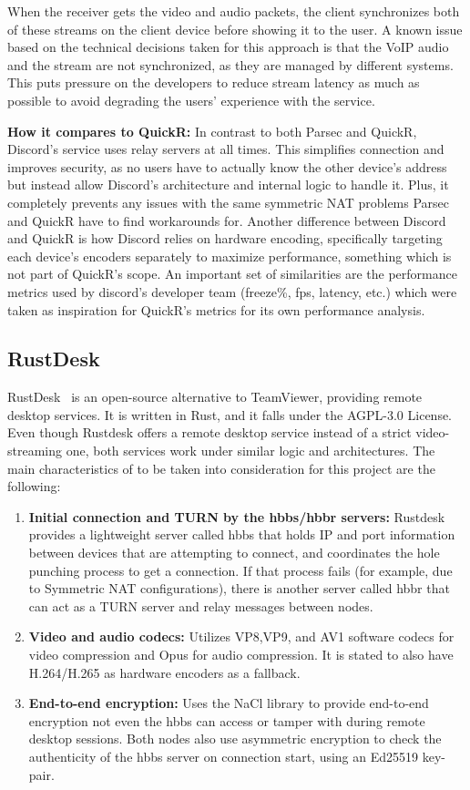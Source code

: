 \documentclass{article}
\begin{document}
    When the receiver gets the video and audio packets, the client synchronizes both of these streams on the client device before showing it to the user. A known issue based on the technical decisions taken for this approach is that the VoIP audio and the stream are not synchronized, as they are managed by 
    different systems. This puts pressure on the developers to reduce stream latency as much as possible to avoid degrading the users' experience with the service.

    \textbf{How it compares to QuickR:} In contrast to both Parsec and QuickR, Discord's service uses relay servers at all times. This simplifies connection and improves security, as no users have to actually know the other device's address but instead allow Discord's architecture and internal logic to handle it. Plus, it completely prevents any issues with the same
    symmetric NAT problems Parsec and QuickR have to find workarounds for. Another difference between Discord and QuickR is how Discord relies on hardware encoding, specifically targeting each device's encoders separately to maximize performance, something which is not part of QuickR's scope. An important set of similarities are the performance metrics used by discord's developer team (freeze\%, fps, latency, etc.)
    which were taken as inspiration for QuickR's metrics for its own performance analysis.

    \subsection{RustDesk}
    RustDesk~\cite{rustdesk_repo} is an open-source alternative to TeamViewer, providing remote desktop services. It is written in Rust, and it falls under the AGPL-3.0 License. Even though Rustdesk offers a remote desktop service instead of a strict video-streaming one, both services work under similar logic and architectures. 
    The main characteristics of to be taken into consideration for this project are the following:
    \begin{enumerate}
        \item \textbf{Initial connection and TURN by the hbbs/hbbr servers:} Rustdesk provides a lightweight server called hbbs that holds IP and port information between devices that are attempting to connect, and coordinates the hole punching process to get a connection. If that process fails (for example, due to Symmetric NAT configurations), 
        there is another server called hbbr that can act as a TURN server and relay messages between nodes.~\cite{rustdesk_server}
        \item \textbf{Video and audio codecs:} Utilizes VP8,VP9, and AV1 software codecs for video compression and Opus for audio compression. It is stated to also have H.264/H.265 as hardware encoders as a fallback.
        \item\textbf{End-to-end encryption:} Uses the NaCl library to provide end-to-end encryption not even the hbbs can access or tamper with during remote desktop sessions. Both nodes also use asymmetric encryption to check the authenticity of the hbbs server on connection start, using an Ed25519 key-pair. 
    \end{enumerate}
\end{document}
